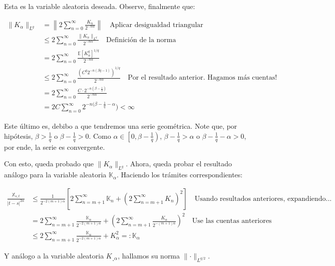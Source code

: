Esta es la variable aleatoria deseada. Observe, finalmente que:

\begin{align*}
	\lVert K_{\alpha} \rVert_{L^q} &= \left\lVert 2 \sum_{n=0}^{\infty} \frac{K_n}{2^{-n\alpha}} \right\rVert \quad \text{Aplicar desigualdad triangular} \\
	&\leq 2 \sum_{n=0}^{\infty} \frac{ \lVert K_n \rVert_{L^q} }{ 2^{-n\alpha} } \quad \text{Definición de la norma} \\
	&= 2 \sum_{n=0}^{\infty} \frac{ \mathbb{E}[K_n^q]^{1/q} }{ 2^{-n\alpha} }\\
	&\leq 2 \sum_{n=0}^{\infty} \frac{  \left(C^q 2^{-n(\beta q - 1)} \right)^{1/q}  }{ 2^{-n\alpha} } \quad \text{Por el resultado anterior. Hagamos más cuentas!} \\
	&= 2 \sum_{n=0}^{\infty} \frac{  C \cdot 2^{-n(\beta - \frac{1}{q})}  }{ 2^{-n\alpha} } \\
	&= 2C \sum_{n=0}^{\infty} 2^{-n(\beta - \frac{1}{q} - \alpha}) < \infty
\end{align*}

Este último es, debibo a que tendremos una serie geométrica. Note que, por hipótesis, $\beta > \frac{1}{q}$ o $\beta - \frac{1}{q} > 0$. Como $\alpha \in \left[ 0, \beta - \frac{1}{q} \right)$, $\beta - \frac{1}{q} > \alpha$ o $\beta - \frac{1}{q} - \alpha > 0$, por ende, la serie es convergente.

Con esto, queda probado que $\lVert K_{\alpha} \rVert_{L^q}$. Ahora, queda probar el resultado análogo para la variable aleatoria $\mathbb{K}_{\alpha}$. Haciendo los trámites correspondientes:

\begin{align*}
	\frac{ \mathbb{X}_{s,t} }{ \lvert t - s \rvert^{2\alpha} } &\leq \frac{1}{2^{-2(m+1)\alpha}} \left[ 2 \sum_{n = m + 1}^{\infty} \mathbb{K}_n + \left( 2 \sum_{n = m + 1}^{\infty} K_n \right)^2 \right] \quad \text{Usando resultados anteriores, expandiendo...} \\
	&= 2 \sum_{n = m + 1}^{\infty} \frac{ \mathbb{K}_n }{ 2^{-2(m+1)\alpha} } + \left( 2 \sum_{n = m + 1}^{\infty} \frac{K_n}{2^{-(m+1)\alpha}} \right)^2 \quad \text{Use las cuentas anteriores} \\
	&\leq 2 \sum_{n = m + 1}^{\infty} \frac{ \mathbb{K}_n }{ 2^{-2(m+1)\alpha} } + K_{\alpha}^2 =: \mathbb{K}_{\alpha}
\end{align*}

Y análogo a la variable aleatoria $K_{¸\alpha}$, hallamos su norma $\lVert \cdot \rVert_{L^{q/2}}$.

